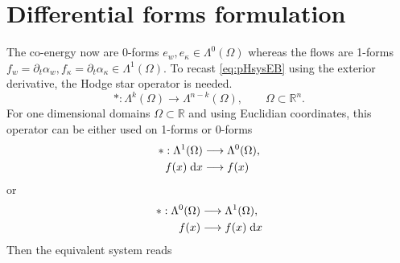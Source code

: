 \documentclass{article}
\begin{document}
\section{Differential forms formulation}

The co-energy now are 0-forms $e_w, e_\kappa \in \Lambda^0(\Omega)$ whereas the flows are 1-forms $f_w= \partial_t \alpha_w, f_\kappa= \partial_t \alpha_\kappa \in \Lambda^1(\Omega)$. To recast \eqref{eq:pHsysEB} using the exterior derivative, the Hodge star operator is needed.
\begin{equation}
	*: \Lambda^k(\Omega) \rightarrow \Lambda^{n-k}(\Omega), \qquad \Omega \subset \mathbb{R}^n.
\end{equation}
For one dimensional domains $\Omega \subset \mathbb{R}$ and using Euclidian coordinates, this operator can be either used on 1-forms or 0-forms
\begin{equation}
\begin{aligned}
*: \Lambda^1(\Omega) &\longrightarrow \Lambda^0(\Omega), \\
 f(x)\d{x} &\longrightarrow f(x)
\end{aligned}
\end{equation}
 or 
\begin{equation}
\begin{aligned}
*: \Lambda^0(\Omega) &\longrightarrow \Lambda^1(\Omega), \\
f(x) &\longrightarrow f(x)\d{x}
\end{aligned}
\end{equation}
Then the equivalent system reads 
\end{document}
